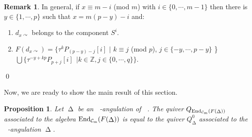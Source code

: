 \documentclass{amsart}
\theoremstyle{plain}
\newtheorem{prop}[teo]{Proposition}
\theoremstyle{definition}
\newtheorem{obs}[teo]{Remark}
\begin{document}
\begin{obs}
In general, if $x\equiv m-i$ (mod $m$) with  $i\in \{0,\cdots,m-1\}$ then   there is  $y\in \{1,\cdots,p\}$ such that  $x=m(p-y)-i$ and:

\begin{enumerate}

  \item   $d_{x\curvearrowright}$ belongs to the component $S^i$.
  \item   $F(d_{x\curvearrowright})=\{\tau ^kP_{(p-y)-j}[i]$ $|$ $k\equiv j$ (mod $p$), $j\in \{-y,\cdots,p-y\}$ \} $\bigcup \{ \tau^{-y+kp}P_{p+j}[i] \ \  |  k\in \mathbb{Z}, j\in \{0, \cdots, q\}\} $.
\end{enumerate}
\end{obs}
\qed

Now, we are ready to show the main result of this section.

\begin{prop} Let ${\mathop{\Delta}\nolimits}$ be an  ${\mathop{(m+2)}\nolimits}$-angulation of ${\mathop{P_{p,q,m}}\nolimits}$.
The quiver $Q_{{\mathop{\rm End_{\mathcal{C}_m}}\nolimits}(F({\mathop{\Delta}\nolimits}))}$ associated  to the algebra  ${\mathop{\rm End_{\mathcal{C}_m}}\nolimits}(F({\mathop{\Delta}\nolimits}))$  is equal to the quiver   $Q_{\mathop{\Delta}\nolimits}^0$ associated to the  ${\mathop{(m+2)}\nolimits}$-angulation ${\mathop{\Delta}\nolimits}$.

\end{prop}
\end{document}
